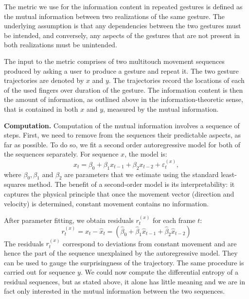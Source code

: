 \documentclass{sig-alternate-10pt}
\begin{document}
The metric we use for the information content in repeated gestures
is defined as the mutual information between two realizations of the
same gesture. The underlying assumption is that any dependencies
between the two gestures must be intended, and conversely, any aspects of the gestures that are not present in both realizations must be unintended. 




The input to the metric comprises of two multitouch movement sequences produced by asking a user to produce a gesture and repeat it.
The two gesture trajectories are denoted by $x$ and $y$.
The trajectories record the locations of each of the used fingers
over duration of the gesture. 
The information content is then the amount of information, as
outlined above in the information-theoretic sense, that is contained in both $x$ and $y$, measured by the mutual information.

\textbf{Computation.} Computation of the mutual information involves a sequence of steps.
First, we need to remove from the sequences their predictable
aspects, as far as possible. To do so, we fit a second order autoregressive model for both of the sequences separately. 
For sequence $x$, the model is: 
\begin{equation}
x_t = \beta_0 + \beta_1x_{t-1} + \beta_2x_{t-2} + \varepsilon_t^{(x)},
\end{equation}
where $\beta_0, \beta_1$ and $\beta_2$ are parameters that we estimate
using the standard least-squares method.
The benefit of a second-order model is its interpretability: it captures the physical principle that once the movement vector (direction and velocity) is determined, constant movement contains no information. 

After parameter fitting, we obtain residuals $r_t^{(x)}$ for each frame $t$:
\begin{equation}
r_t^{(x)} = x_t - \hat x_t = (\hat \beta_0 + \hat \beta_1\hat x_{t-1} + \hat \beta_2\hat x_{t-2})
\end{equation}
The residuals $r_t^{(x)}$ correspond to deviations from constant movement and are hence the part of the sequence unexplained by the autoregressive model. They can be used to gauge the surprisingness of the trajectory. The same procedure is carried out for sequence $y$.
We could now compute the differential entropy of a residual sequences, but as stated above, it alone has little meaning and we are in fact only interested in the mutual information between the two sequences.
\end{document}
